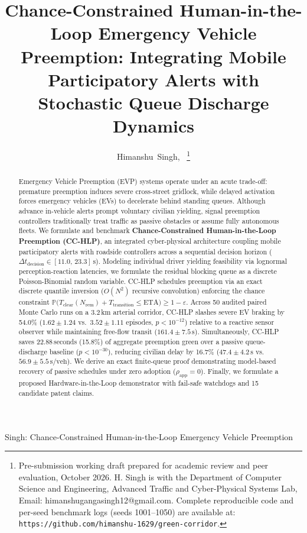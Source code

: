 \documentclass[journal,10pt,twocolumn]{IEEEtran}
\begin{document}
\title{Chance-Constrained Human-in-the-Loop Emergency Vehicle Preemption: Integrating Mobile Participatory Alerts with Stochastic Queue Discharge Dynamics}

\author{Himanshu~Singh,~
\thanks{Pre-submission working draft prepared for academic review and peer evaluation, October 2026. H. Singh is with the Department of Computer Science and Engineering, Advanced Traffic and Cyber-Physical Systems Lab, Email: himanshugangasingh12@gmail.com. Complete reproducible code and per-seed benchmark logs (seeds 1001--1050) are available at: \texttt{https://github.com/himanshu-1629/green-corridor}.}
}

%
{Singh: Chance-Constrained Human-in-the-Loop Emergency Vehicle Preemption}

\maketitle

\begin{abstract}
Emergency Vehicle Preemption (EVP) systems operate under an acute trade-off: premature preemption induces severe cross-street gridlock, while delayed activation forces emergency vehicles (EVs) to decelerate behind standing queues. Although advance in-vehicle alerts prompt voluntary civilian yielding, signal preemption controllers traditionally treat traffic as passive obstacles or assume fully autonomous fleets. We formulate and benchmark \textbf{Chance-Constrained Human-in-the-Loop Preemption (CC-HLP)}, an integrated cyber-physical architecture coupling mobile participatory alerts with roadside controllers across a sequential decision horizon ($\Delta t_{\text{decision}} \in [11.0,\, 23.3]\,\text{s}$). Modeling individual driver yielding feasibility via lognormal perception-reaction latencies, we formulate the residual blocking queue as a discrete Poisson-Binomial random variable. CC-HLP schedules preemption via an exact discrete quantile inversion ($O(N^2)$ recursive convolution) enforcing the chance constraint $\mathbb{P}\bigl( T_{\text{clear}}(N_{\text{rem}}) + T_{\text{transition}} \le \text{ETA} \bigr) \ge 1 - \varepsilon$. Across 50 audited paired Monte Carlo runs on a 3.2\,km arterial corridor, CC-HLP slashes severe EV braking by 54.0\% ($1.62 \pm 1.24$ vs.\ $3.52 \pm 1.11$ episodes, $p < 10^{-12}$) relative to a reactive sensor observer while maintaining free-flow transit ($161.4 \pm 7.5\,\text{s}$). Simultaneously, CC-HLP saves 22.88\,seconds (15.8\%) of aggregate preemption green over a passive queue-discharge baseline ($p < 10^{-30}$), reducing civilian delay by 16.7\% ($47.4 \pm 4.2\,\text{s}$ vs.\ $56.9 \pm 5.5\,\text{s/veh}$). We derive an exact finite-queue proof demonstrating model-based recovery of passive schedules under zero adoption ($\rho_{\text{app}} = 0$). Finally, we formulate a proposed Hardware-in-the-Loop demonstrator with fail-safe watchdogs and 15 candidate patent claims.
\end{abstract}
\end{document}
